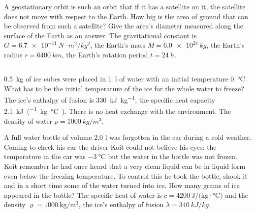 \documentclass[11pt]{article}
\begin{document}

\probeng
A geostationary orbit is such an orbit that if it has a satellite on it, the satellite does not move with respect to the Earth. How big is the area of ground that can be observed from such a satellite? Give the area’s diameter measured along the surface of the Earth as an answer. The gravitational constant is $G=\SI{6.7e-11}{N \cdot m^2/kg^2}$, the Earth’s mass $M=\SI{6,0e24}{kg}$, the Earth’s radius $r=\SI{6400}{km}$, the Earth’s rotation period $t=\SI{24}{h}$.
\probend
\bigskip
\newpage\subsection{\protect{}}


\probeng
\SI{0,5}{kg} of ice cubes were placed in \SI{1}{l} of water with an initial temperature \SI{0}{\degreeCelsius}. What has to be the initial temperature of the ice for the whole water to freeze? The ice’s enthalpy of fusion is \SI{330}{\kilo\joule\per\kilo\gram}, the specific heat capacity \SI{2,1}{\kilo\joule\per(\kilogram.\degreeCelsius)}. There is no heat exchange with the environment. The density of water $\rho = \SI{1000}{kg/m^3}$.
\probend
\bigskip


\probeng
A full water bottle of volume 2,0 l was forgotten in the car during a cold weather. Coming to check his car the driver Koit could not believe his eyes: the temperature in the car was $-\SI{3}{\degreeCelsius}$ but the water in the bottle was not frozen. Koit remember he had once heard that a very clean liquid can be in liquid form even below the freezing temperature. To control this he took the bottle, shook it and in a short time some of the water turned into ice. How many grams of ice appeared in the bottle? The specific heat of water is $c = \SI{4200}{\joule\per(\kilogram \cdot \degreeCelsius)}$ and the density $\varrho = \SI{1000}{\kilogram\per\meter\cubed}$, the ice’s enthalpy of fusion $\lambda = \SI{340}{ kJ/kg}$.
\probend
\bigskip
\end{document}
